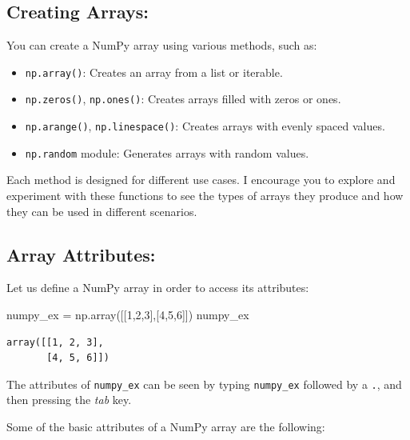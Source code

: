 \documentclass[
  letterpaper,
  DIV=11,
  numbers=noendperiod]{scrreprt}
\newenvironment{Shaded}{\begin{snugshade}}{\end{snugshade}}
\newcommand{\DecValTok}[1]{\textcolor[rgb]{0.68,0.00,0.00}{#1}}
\newcommand{\NormalTok}[1]{\textcolor[rgb]{0.00,0.23,0.31}{#1}}
\newcommand{\OperatorTok}[1]{\textcolor[rgb]{0.37,0.37,0.37}{#1}}
\providecommand{\tightlist}{%
  \setlength{\itemsep}{0pt}\setlength{\parskip}{0pt}}\usepackage{longtable,booktabs,array}
\begin{document}
\hypertarget{creating-arrays}{%
\subsection{Creating Arrays:}\label{creating-arrays}}

You can create a NumPy array using various methods, such as:

\begin{itemize}
\tightlist
\item
  \texttt{np.array()}: Creates an array from a list or iterable.
\item
  \texttt{np.zeros()}, \texttt{np.ones()}: Creates arrays filled with
  zeros or ones.
\item
  \texttt{np.arange()}, \texttt{np.linespace()}: Creates arrays with
  evenly spaced values.
\item
  \texttt{np.random} module: Generates arrays with random values.
\end{itemize}

Each method is designed for different use cases. I encourage you to
explore and experiment with these functions to see the types of arrays
they produce and how they can be used in different scenarios.

\hypertarget{array-attributes}{%
\subsection{Array Attributes:}\label{array-attributes}}

Let us define a NumPy array in order to access its attributes:

\begin{Shaded}
\begin{Highlighting}[]
\NormalTok{numpy\_ex }\OperatorTok{=}\NormalTok{ np.array([[}\DecValTok{1}\NormalTok{,}\DecValTok{2}\NormalTok{,}\DecValTok{3}\NormalTok{],[}\DecValTok{4}\NormalTok{,}\DecValTok{5}\NormalTok{,}\DecValTok{6}\NormalTok{]])}
\NormalTok{numpy\_ex}
\end{Highlighting}
\end{Shaded}

\begin{verbatim}
array([[1, 2, 3],
       [4, 5, 6]])
\end{verbatim}

The attributes of \texttt{numpy\_ex} can be seen by typing
\texttt{numpy\_ex} followed by a \texttt{.}, and then pressing the
\emph{tab} key.

Some of the basic attributes of a NumPy array are the following:
\end{document}
